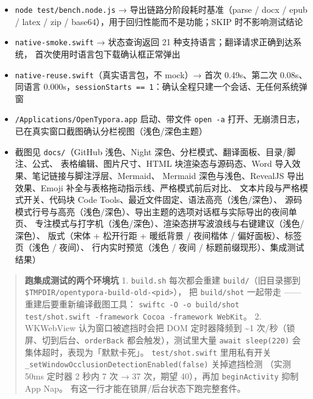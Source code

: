 \documentclass[11pt,a4paper]{ctexart}
\begin{document}
\begin{itemize}
行首插字与强调里插字都落回原文、删空强调不留星号、自动配对出来的 \texttt{*} 能长成斜体、
标题的 \texttt{\#\# } 藏起来且光标到行首才现形、行首退格一次去掉整个前缀并变回正文、
贴着露出的标记退格删的是原文（不是死键）、Enter 分块与行首退格合并、
撤销、代码/链接/多行/任务框退回 textarea、开关关掉退回、组字只在结束时落账、
\texttt{.value} / \texttt{setSelectionRange} 这层 shim、退出后回到渲染态、反复进出不残留）
\item \texttt{node test/bench.node.js} → 导出链路分阶段耗时基准（parse / docx / epub / latex /
zip / base64），用于回归性能而不是功能；SKIP 时不影响测试结论
\item \texttt{native-smoke.swift} → 状态查询返回 21 种支持语言；翻译请求正确到达系统，
首次使用时语言包下载确认框正常弹出
\item \texttt{native-reuse.swift}（真实语言包，不 mock）→ 首次 0.49s、第二次 0.08s、
同语言 0.000s，\texttt{sessionStarts == 1}：确认全程只建一个会话、无任何系统弹窗
\item \texttt{/Applications/OpenTypora.app} 启动、带文件 \texttt{open -a} 打开、无崩溃日志，
已在真实窗口截图确认分栏视图（浅色/深色主题）
\item 截图见 \texttt{docs/}（GitHub 浅色、Night 深色、分栏模式、翻译面板、目录/脚注、公式、
表格编辑、图片尺寸、HTML 块渲染态与源码态、Word 导入效果、笔记链接与脚注浮层、Mermaid、
Mermaid 深色与浅色、RevealJS 导出效果、Emoji 补全与表格拖动指示线、严格模式前后对比、
文本片段与严格模式开关、代码块 Code Tools、最近文件固定、语法高亮（浅色/深色）、
源码模式行号与高亮（浅色/深色）、导出主题的选项对话框与实际导出的夜间单页、
专注模式与打字机（浅色/深色）、渲染态拼写波浪线与右键建议（浅色/深色）、
版式（宋体 + 松开行距 + 暖纸背景 / 夜间楷体 / 偏好面板）、标签页（浅色 / 夜间）、
行内实时预览（浅色 / 夜间 / 标题前缀现形）、集成测试结果）
\end{itemize}


\begin{quote}
\textbf{跑集成测试的两个环境坑} 1. \texttt{build.sh} 每次都会重建 \texttt{build/}（旧目录挪到 \texttt{\$TMPDIR/opentypora-build-old-\textless{}pid\textgreater{}}），    把 \texttt{build/shot} 一起带走 —— 重建后要重新编译截图工具：    \texttt{swiftc -O -o build/shot test/shot.swift -framework Cocoa -framework WebKit}。 2. WKWebView 认为窗口被遮挡时会把 DOM 定时器降频到 \textasciitilde{}1 次/秒（锁屏、切到后台、\texttt{orderBack}    都会触发），测试里大量 \texttt{await sleep(220)} 会集体超时，表现为「默默卡死」。    \texttt{test/shot.swift} 里用私有开关 \texttt{\_setWindowOcclusionDetectionEnabled(false)} 关掉遮挡检测    （实测 50ms 定时器 2 秒内 7 次 → 37 次，期望 40），再加 \texttt{beginActivity} 抑制 App Nap。    有这一行才能在锁屏/后台状态下跑完整套件。
\end{quote}
\end{document}
